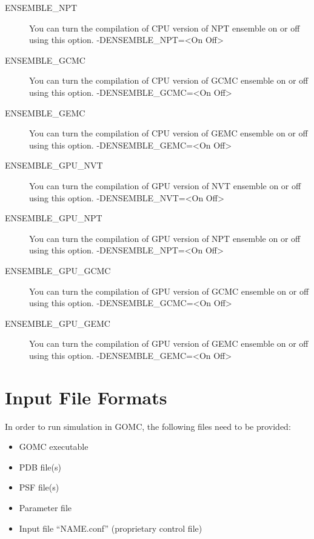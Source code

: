 \documentclass[letterpaper,10pt,english]{sphinxmanual}
\begin{document}
\begin{description}
\item[{ENSEMBLE\_NPT}] \leavevmode
You can turn the compilation of CPU version of NPT ensemble on or off using this option.
-DENSEMBLE\_NPT=\textless{}On \textbar{} Off\textgreater{}

\item[{ENSEMBLE\_GCMC}] \leavevmode
You can turn the compilation of CPU version of GCMC ensemble on or off using this option.
-DENSEMBLE\_GCMC=\textless{}On \textbar{} Off\textgreater{}

\item[{ENSEMBLE\_GEMC}] \leavevmode
You can turn the compilation of CPU version of GEMC ensemble on or off using this option.
-DENSEMBLE\_GEMC=\textless{}On \textbar{} Off\textgreater{}

\item[{ENSEMBLE\_GPU\_NVT}] \leavevmode
You can turn the compilation of GPU version of NVT ensemble on or off using this option.
-DENSEMBLE\_NVT=\textless{}On \textbar{} Off\textgreater{}

\item[{ENSEMBLE\_GPU\_NPT}] \leavevmode
You can turn the compilation of GPU version of NPT ensemble on or off using this option.
-DENSEMBLE\_NPT=\textless{}On \textbar{} Off\textgreater{}

\item[{ENSEMBLE\_GPU\_GCMC}] \leavevmode
You can turn the compilation of GPU version of GCMC ensemble on or off using this option.
-DENSEMBLE\_GCMC=\textless{}On \textbar{} Off\textgreater{}

\item[{ENSEMBLE\_GPU\_GEMC}] \leavevmode
You can turn the compilation of GPU version of GEMC ensemble on or off using this option.
-DENSEMBLE\_GEMC=\textless{}On \textbar{} Off\textgreater{}

\end{description}


\chapter{Input File Formats}
\label{\detokenize{input_file:input-file-formats}}\label{\detokenize{input_file::doc}}
In order to run simulation in GOMC, the following files need to be provided:
\begin{itemize}
\item {} 
GOMC executable

\item {} 
PDB file(s)

\item {} 
PSF file(s)

\item {} 
Parameter file

\item {} 
Input file “NAME.conf” (proprietary control file)

\end{itemize}
\end{document}
